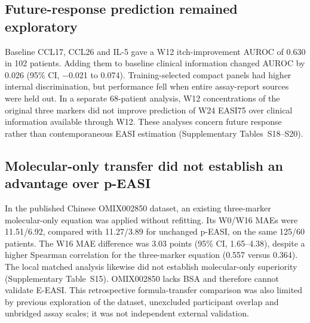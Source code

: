 \subsection{Future-response prediction remained exploratory}
Baseline CCL17, CCL26 and IL-5 gave a W12 itch-improvement AUROC of 0.630 in 102 patients. Adding them to baseline clinical information changed AUROC by 0.026 (95\% CI, $-$0.021 to 0.074). Training-selected compact panels had higher internal discrimination, but performance fell when entire assay-report sources were held out. In a separate 68-patient analysis, W12 concentrations of the original three markers did not improve prediction of W24 EASI75 over clinical information available through W12. These analyses concern future response rather than contemporaneous EASI estimation (Supplementary Tables~S18--S20).

\subsection{Molecular-only transfer did not establish an advantage over p-EASI}
In the published Chinese OMIX002850 dataset, an existing three-marker molecular-only equation was applied without refitting. Its W0/W16 MAEs were 11.51/6.92, compared with 11.27/3.89 for unchanged p-EASI, on the same 125/60 patients. The W16 MAE difference was 3.03 points (95\% CI, 1.65--4.38), despite a higher Spearman correlation for the three-marker equation (0.557 versus 0.364). The local matched analysis likewise did not establish molecular-only superiority (Supplementary Table~S15). OMIX002850 lacks BSA and therefore cannot validate E-EASI. This retrospective formula-transfer comparison was also limited by previous exploration of the dataset, unexcluded participant overlap and unbridged assay scales; it was not independent external validation.
